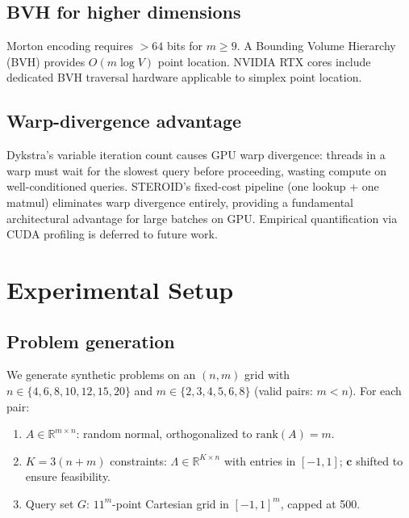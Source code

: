 \documentclass[review,onefignum,onetabnum]{./SIAM_template/siamart171218}
\begin{document}
\subsection{BVH for higher dimensions}

Morton encoding requires $>64$ bits for $m \geq 9$.  A Bounding Volume Hierarchy
(BVH) provides $O(m \log V)$ point location.  NVIDIA RTX cores include dedicated BVH
traversal hardware applicable to simplex point location.

\subsection{Warp-divergence advantage}

Dykstra's variable iteration count causes GPU warp divergence: threads in a
warp must wait for the slowest query before proceeding, wasting compute on
well-conditioned queries.  STEROID's fixed-cost pipeline (one lookup + one
matmul) eliminates warp divergence entirely, providing a fundamental
architectural advantage for large batches on GPU.  Empirical quantification
via CUDA profiling is deferred to future work.

\section{Experimental Setup}
\label{sec:experiments}

\subsection{Problem generation}

We generate synthetic problems on an $(n,m)$ grid with $n \in \{4,6,8,10,12,15,20\}$
and $m \in \{2,3,4,5,6,8\}$ (valid pairs: $m < n$).  For each pair:
\begin{enumerate}
	\item $A \in \mathbb{R}^{m \times n}$: random normal, orthogonalized to
	      $\mathrm{rank}(A) = m$.
	\item $K = 3(n+m)$ constraints: $\Lambda \in \mathbb{R}^{K \times n}$ with entries
	      in $[-1,1]$; $\mathbf{c}$ shifted to ensure feasibility.
	\item Query set $G$: $11^m$-point Cartesian grid in $[-1,1]^m$, capped at 500.
\end{enumerate}
\end{document}
